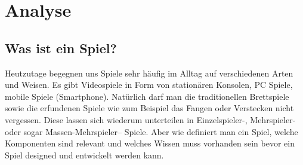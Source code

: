 \section{Analyse}
\subsection{Was ist ein Spiel?}
Heutzutage begegnen uns  Spiele sehr häufig im Alltag auf verschiedenen Arten und Weisen. Es gibt Videospiele in Form von stationären Konsolen,  PC Spiele, mobile Spiele (Smartphone).  Natürlich darf man  die traditionellen Brettspiele sowie die erfundenen Spiele wie zum Beispiel das Fangen oder Verstecken nicht vergessen. Diese lassen sich wiederum unterteilen in Einzelspieler-, Mehrspieler- oder sogar Massen-Mehrspieler– Spiele.  Aber wie definiert man ein Spiel, welche Komponenten sind relevant und welches Wissen muss vorhanden sein bevor ein Spiel designed und entwickelt werden kann. 

